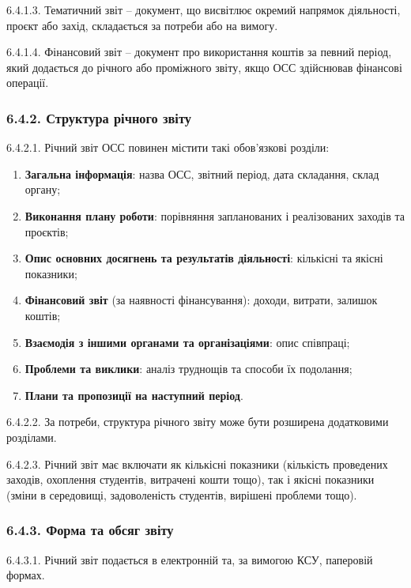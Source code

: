         6.4.1.3. Тематичний звіт -- документ, що висвітлює окремий напрямок діяльності, проєкт або захід, складається за потреби або на вимогу.
        
        6.4.1.4. Фінансовий звіт -- документ про використання коштів за певний період, який додається до річного або проміжного звіту, якщо ОСС здійснював фінансові операції.

    \subsubsection*{6.4.2. Структура річного звіту}
        6.4.2.1. Річний звіт ОСС повинен містити такі обов'язкові розділи:

            \begin{enumerate}[label=\alph*)]
                \item \textbf{Загальна інформація}: назва ОСС, звітний період, дата складання, склад органу;
                \item \textbf{Виконання плану роботи}: порівняння запланованих і реалізованих заходів та проєктів;
                \item \textbf{Опис основних досягнень та результатів діяльності}: кількісні та якісні показники;
                \item \textbf{Фінансовий звіт} (за наявності фінансування): доходи, витрати, залишок коштів;
                \item \textbf{Взаємодія з іншими органами та організаціями}: опис співпраці;
                \item \textbf{Проблеми та виклики}: аналіз труднощів та способи їх подолання;
                \item \textbf{Плани та пропозиції на наступний період}.
            \end{enumerate}
            
        6.4.2.2. За потреби, структура річного звіту може бути розширена додатковими розділами.
        
        6.4.2.3. Річний звіт має включати як кількісні показники (кількість проведених заходів, охоплення студентів, витрачені кошти тощо), так і якісні показники (зміни в середовищі, задоволеність студентів, вирішені проблеми тощо).

    \subsubsection*{6.4.3. Форма та обсяг звіту}
        6.4.3.1. Річний звіт подається в електронній та, за вимогою КСУ, паперовій формах.
        

